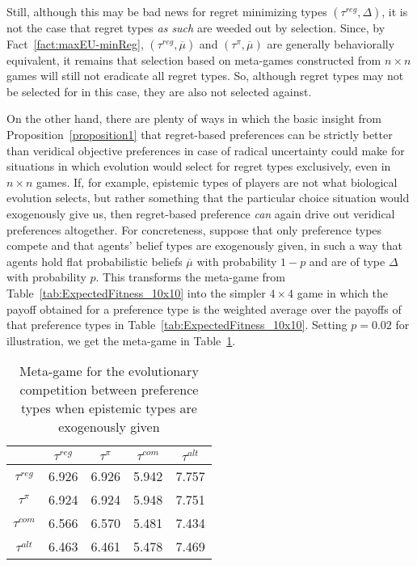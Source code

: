 \documentclass[fleqn,reqno,11pt]{article}
\begin{document}
Still, although this may be bad news for regret minimizing types
$(\tau^{reg}, \Delta)$, it is not the case that regret types \emph{as such} are weeded
out by selection. Since, by Fact~\ref{fact:maxEU-minReg}, $(\tau^{reg}, \overline{\mu})$ and
$(\tau^{\pi}, \overline{\mu})$ are generally behaviorally equivalent, it remains that
selection based on meta-games constructed from $n \times n$ games will still not eradicate all
regret types. So, although regret types may not be selected for in this case, they are also not
selected against.

On the other hand, there are plenty of ways in which the basic insight from
Proposition~\ref{proposition1} that regret-based preferences can be strictly better than
veridical objective preferences in case of radical uncertainty could make for situations in
which evolution would select for regret types exclusively, even in $n \times n$ games. If, for
example, epistemic types of players are not what biological evolution selects, but rather
something that the particular choice situation would exogenously give us, then regret-based
preference \emph{can} again drive out veridical preferences altogether. For concreteness,
suppose that only preference types compete and that agents' belief types are exogenously
given, in such a way that agents hold flat probabilistic beliefs $\overline{\mu}$ with probability
$1-p$ and are of type $\Delta$ with probability $p$. This transforms the meta-game from
Table~\ref{tab:ExpectedFitness_10x10} into the simpler $4 \times 4$ game in which the payoff
obtained for a preference type is the weighted average over the payoffs of that preference
types in Table~\ref{tab:ExpectedFitness_10x10}. Setting $p = 0.02$ for illustration, we get the
meta-game in Table~\ref{tab:ExogeneousEpistemics}. 

\begin{table}[]
\centering
\begin{tabular}{ccccc}
  \toprule
  & $\tau^{reg}$ 
  & $\tau^{\pi}$ 
  & $\tau^{com}$
  & $\tau^{alt}$ \\ 
  \midrule
  $\tau^{reg} $ & 6.926 & 6.926 & 5.942 & 7.757 \\ 
  $\tau^{\pi} $ & 6.924 & 6.924 & 5.948 & 7.751 \\ 
  $\tau^{com }$ & 6.566 & 6.570 & 5.481 & 7.434 \\ 
  $\tau^{alt} $ & 6.463 & 6.461 & 5.478 & 7.469 \\ 
   \bottomrule
\end{tabular}
\caption{Meta-game for the evolutionary competition between preference types when epistemic types are exogenously
  given}
\label{tab:ExogeneousEpistemics}
\end{table}
\end{document}
